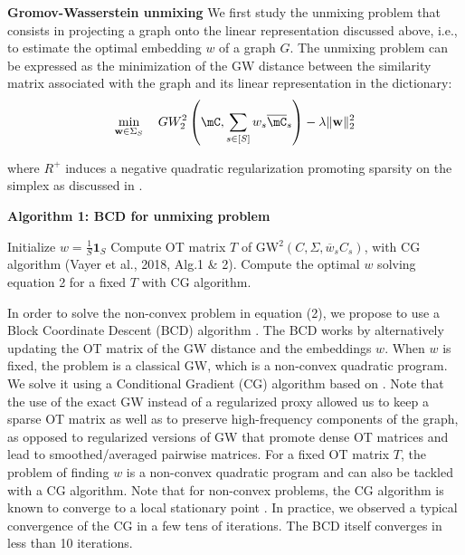 \documentclass[preprint,11pt]{elsarticle}
\newcommand{\vw}{\mathbf{w}} %
\begin{document}
\textbf{Gromov-Wasserstein unmixing} We first study the unmixing problem that consists in projecting a graph onto the linear representation discussed above, i.e., to estimate the optimal embedding \( w \) of a graph \( G \). The unmixing problem can be expressed as the minimization of the GW distance between the similarity matrix associated with the graph and its linear representation in the dictionary:
\begin{equation}
    \min_{\vw \in \Sigma_S}\quad GW^2_2\left(\mC, \sum_{s \in [S]} w_s \overline{\mC}_s\right) - \lambda \|\vw\|^2_2 \label{eq:unmix}
\end{equation}   
	
	
where \( R^+ \) induces a negative quadratic regularization promoting sparsity on the simplex as discussed in \cite{li2016methods}.

\textbf{Algorithm 1: BCD for unmixing problem}

\begin{algorithm}[H]
\caption{BCD for unmixing problem 2}
\begin{algorithmic}
\State Initialize $w = \frac{1}{S} \mathbf{1}_S$
\Repeat
\State Compute OT matrix $T$ of GW$^2(C, \Sigma, \overline{w}_s C_s)$, with CG algorithm (Vayer et al., 2018, Alg.1 & 2).
\State Compute the optimal $w$ solving equation 2 for a fixed $T$ with CG algorithm.
\end{algorithmic}
\end{algorithm}

In order to solve the non-convex problem in equation (2), we propose to use a Block Coordinate Descent (BCD) algorithm \cite{tseng2001convergence}. The BCD works by alternatively updating the OT matrix of the GW distance and the embeddings \( w \). When \( w \) is fixed, the problem is a classical GW, which is a non-convex quadratic program. We solve it using a Conditional Gradient (CG) algorithm \cite{jaggi2013revisiting} based on \cite{vayer-optimal-nodate}. Note that the use of the exact GW instead of a regularized proxy allowed us to keep a sparse OT matrix as well as to preserve high-frequency components of the graph, as opposed to regularized versions of GW \cite{peyre2016gromov,solomon_entropic_2016,xu2019gromov} that promote dense OT matrices and lead to smoothed/averaged pairwise matrices. For a fixed OT matrix \( T \), the problem of finding \( w \) is a non-convex quadratic program and can also be tackled with a CG algorithm. Note that for non-convex problems, the CG algorithm is known to converge to a local stationary point \cite{lacoste-julien-convergence-2016}. In practice, we observed a typical convergence of the CG in a few tens of iterations. The BCD itself converges in less than 10 iterations.
\end{document}
